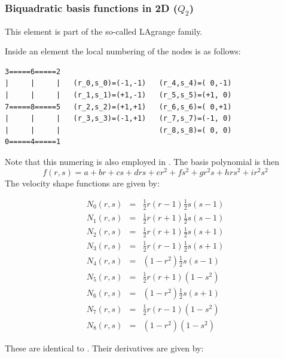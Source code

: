 \subsubsection{Biquadratic basis functions in 2D ($Q_2$)}\label{ss:q22d}

This element is part of the so-called LAgrange family. 

Inside an element the local numbering of the nodes is as follows:
\begin{verbatim}
3=====6=====2
|     |     |   (r_0,s_0)=(-1,-1)   (r_4,s_4)=( 0,-1)
|     |     |   (r_1,s_1)=(+1,-1)   (r_5,s_5)=(+1, 0)
7=====8=====5   (r_2,s_2)=(+1,+1)   (r_6,s_6)=( 0,+1)
|     |     |   (r_3,s_3)=(-1,+1)   (r_7,s_7)=(-1, 0)
|     |     |                       (r_8,s_8)=( 0, 0)
0=====4=====1
\end{verbatim}
Note that this numering is also employed in \cite[56]{li06}.
The basis polynomial is then
\[
f(r,s) = a + br + cs + drs + er^2 + fs^2 + gr^2s + hrs^2 + i r^2s^2
\]
The velocity shape functions are given by:
\begin{mdframed}[backgroundcolor=blue!5]
\begin{eqnarray}
N_0(r,s)&=& \frac{1}{2}r(r-1)  \frac{1}{2}s(s-1)\nonumber\\
N_1(r,s)&=& \frac{1}{2}r(r+1)  \frac{1}{2}s(s-1)\nonumber\\
N_2(r,s)&=& \frac{1}{2}r(r+1)  \frac{1}{2}s(s+1)\nonumber\\
N_3(r,s)&=& \frac{1}{2}r(r-1)  \frac{1}{2}s(s+1)\nonumber\\
N_4(r,s)&=&     (1-r^2)  \frac{1}{2}s(s-1)\nonumber\\
N_5(r,s)&=& \frac{1}{2}r(r+1)      (1-s^2)\nonumber\\
N_6(r,s)&=&     (1-r^2)  \frac{1}{2}s(s+1)\nonumber\\
N_7(r,s)&=& \frac{1}{2}r(r-1)      (1-s^2)\nonumber\\
N_8(r,s)&=&     (1-r^2)      (1-s^2)\nonumber
\end{eqnarray}
\end{mdframed}
These are identical to \cite[p57]{li06}. Their derivatives are given by:
